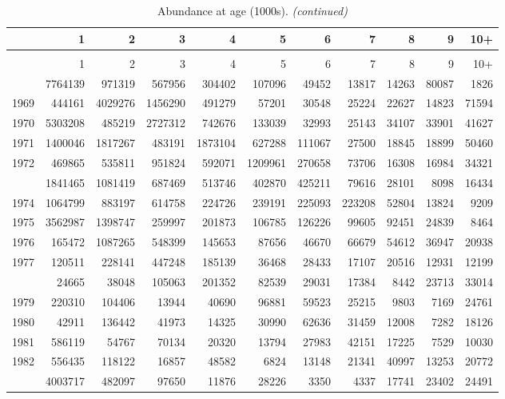 \documentclass[
]{article}
\begin{document}
\begin{longtable}[t]{lrrrrrrrrrr}
\caption{\label{tab:NAA-table}Abundance at age (1000s).}\\
\toprule
  & 1 & 2 & 3 & 4 & 5 & 6 & 7 & 8 & 9 & 10+\\
\midrule
\endfirsthead
\caption[]{Abundance at age (1000s). \textit{(continued)}}\\
\toprule
  & 1 & 2 & 3 & 4 & 5 & 6 & 7 & 8 & 9 & 10+\\
\midrule
\endhead

\endfoot
\bottomrule
\endlastfoot
1968 & 7764139 & 971319 & 567956 & 304402 & 107096 & 49452 & 13817 & 14263 & 80087 & 1826\\
1969 & 444161 & 4029276 & 1456290 & 491279 & 57201 & 30548 & 25224 & 22627 & 14823 & 71594\\
1970 & 5303208 & 485219 & 2727312 & 742676 & 133039 & 32993 & 25143 & 34107 & 33901 & 41627\\
1971 & 1400046 & 1817267 & 483191 & 1873104 & 627288 & 111067 & 27500 & 18845 & 18899 & 50460\\
1972 & 469865 & 535811 & 951824 & 592071 & 1209961 & 270658 & 73706 & 16308 & 16984 & 34321\\
\addlinespace
1973 & 1841465 & 1081419 & 687469 & 513746 & 402870 & 425211 & 79616 & 28101 & 8098 & 16434\\
1974 & 1064799 & 883197 & 614758 & 224726 & 239191 & 225093 & 223208 & 52804 & 13824 & 9209\\
1975 & 3562987 & 1398747 & 259997 & 201873 & 106785 & 126226 & 99605 & 92451 & 24839 & 8464\\
1976 & 165472 & 1087265 & 548399 & 145653 & 87656 & 46670 & 66679 & 54612 & 36947 & 20938\\
1977 & 120511 & 228141 & 447248 & 185139 & 36468 & 28433 & 17107 & 20516 & 12931 & 12199\\
\addlinespace
1978 & 24665 & 38048 & 105063 & 201352 & 82539 & 29031 & 17384 & 8442 & 23713 & 33014\\
1979 & 220310 & 104406 & 13944 & 40690 & 96881 & 59523 & 25215 & 9803 & 7169 & 24761\\
1980 & 42911 & 136442 & 41973 & 14325 & 30990 & 62636 & 31459 & 12008 & 7282 & 18126\\
1981 & 586119 & 54767 & 70134 & 20320 & 13794 & 27983 & 42151 & 17225 & 7529 & 10030\\
1982 & 556435 & 118122 & 16857 & 48582 & 6824 & 13148 & 21341 & 40997 & 13253 & 20772\\
\addlinespace
1983 & 4003717 & 482097 & 97650 & 11876 & 28226 & 3350 & 4337 & 17741 & 23402 & 24491\\

\end{longtable}
\end{document}
